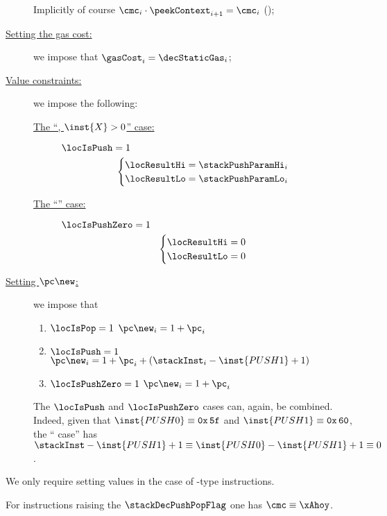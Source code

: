 \begin{description}
		\saNote{}
		Implicitly of course $\cmc_{i} \cdot \peekContext_{i + 1} = \cmc_{i}$ (\trash);
	\item[\underline{Setting the gas cost:}]
		we impose that $\gasCost_{i} = \decStaticGas_{i}$;
	\item[\underline{Value constraints:}]
		we impose the following:
		\begin{description}
			\item[\underline{The ``, $\inst{X} > 0$'' case:}] 
				\If $\locIsPush = 1$ \Then
				\[
					\begin{cases}
						\locResultHi = \stackPushParamHi_{i} \\
						\locResultLo = \stackPushParamLo_{i} \\
					\end{cases}
				\]
			\item[\underline{The ``'' case:}] 
				\If $\locIsPushZero = 1$ \Then
				\[
					\begin{cases}
						\locResultHi = 0 \\
						\locResultLo = 0 \\
					\end{cases}
				\]
		\end{description}
	\item[\underline{Setting $\pc\new$:}]
		we impose that
		\begin{enumerate}
			\item \If $\locIsPop      = 1$ \Then $\pc\new_{i} = 1 + \pc_{i}$
			\item \If $\locIsPush     = 1$ \Then $\pc\new_{i} = 1 + \pc_{i} + (\stackInst_{i} - \inst{PUSH1} + 1)$
			\item \If $\locIsPushZero = 1$ \Then $\pc\new_{i} = 1 + \pc_{i}$
		\end{enumerate}
		\saNote{}
		The $\locIsPush$ and $\locIsPushZero$ cases
		can, again, be combined.
		Indeed, given that
		$\inst{PUSH0} \equiv \texttt{0x\,5f}$ and
		$\inst{PUSH1} \equiv \texttt{0x\,60}$,
		the `` case'' has
		$\stackInst - \inst{PUSH1} + 1 \equiv \inst{PUSH0} - \inst{PUSH1} + 1 \equiv 0$.
\end{description}
\saNote{}
We only require setting values in the case of -type instructions.

\saNote{}
For instructions raising the $\stackDecPushPopFlag$ one has $\cmc \equiv \xAhoy$.
